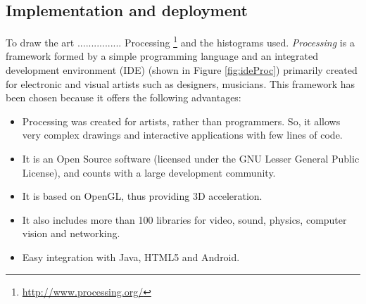 \subsection{Implementation and deployment}



To draw the art ................ Processing
\footnote{\url{http://www.processing.org/}} and the histograms
used. %
 {\em Processing} \cite{PROCESSING} is a framework formed by a simple
 programming language and an integrated development environment (IDE)
 (shown in Figure \ref{fig:ideProc}) primarily created for electronic
 and visual artists such as designers, musicians. This framework has been chosen because it offers
 the following advantages: %

\begin{itemize}
\item Processing was created for artists, rather than programmers. So, it allows very complex drawings and interactive applications with few lines of code.
\item It is an Open Source software (licensed under the GNU Lesser General Public License), and counts with a large development community.
\item It is based on OpenGL, thus providing 3D acceleration.
\item It also includes more than 100 libraries for video, sound, physics, computer vision and networking.
\item Easy integration with Java, HTML5 and Android.
\end{itemize}


